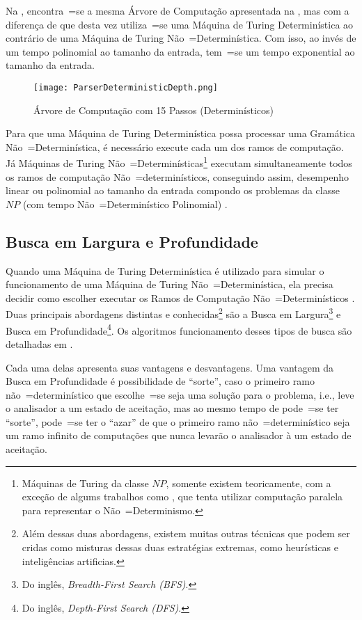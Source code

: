 Na ,
encontra~=se a mesma Árvore de Computação apresentada na ,
mas com a diferença de que desta vez utiliza~=se uma Máquina de Turing Determinística ao contrário de uma Máquina de Turing Não~=Determinística.
Com isso,
ao invés de um tempo polinomial ao tamanho da entrada,
tem~=se um tempo exponential ao tamanho da entrada.
\begin{figure}[!htb]
\caption{Árvore de Computação com 15 Passos (Determinísticos)}
\label{ParserDeterministic}
\centering
\texttt{[image: ParserDeterministicDepth.png]}
\end{figure}

Para que uma Máquina de Turing Determinística possa processar uma Gramática Não~=Determinística,
é necessário execute cada um dos ramos de computação.
Já Máquinas de Turing Não~=Determinísticas\footnote{
Máquinas de Turing da classe $NP$,
somente existem teoricamente,
com a exceção de algums trabalhos como ,
que tenta utilizar computação paralela para representar o Não~=Determinismo.
}
executam simultaneamente todos os ramos de computação Não~=determinísticos,
conseguindo assim, desempenho linear ou
polinomial ao tamanho da entrada compondo os problemas da classe $NP$ (com tempo Não~=Determinístico Polinomial) \cite{hopcroftBook}.


\subsection{Busca em Largura e Profundidade}
\label{buscaEmLarguraEProfundidade}

Quando uma Máquina de Turing Determinística é utilizado para simular o funcionamento de uma Máquina de Turing Não~=Determinística,
ela precisa decidir como escolher executar os Ramos de Computação Não~=Determinísticos \cite{sipserBook}.
Duas principais abordagens distintas e
conhecidas\footnote{
Além dessas duas abordagens,
existem muitas outras técnicas que podem ser cridas como misturas dessas duas estratégias extremas,
como heurísticas e inteligências artificias.
}
são a Busca em Largura\footnote{
Do inglês, \textit{Breadth-First Search (BFS)}.
}
e Busca em Profundidade\footnote{
Do inglês, \textit{Depth-First Search (DFS)}.
}.
Os algoritmos funcionamento desses tipos de busca são detalhadas em .

Cada uma delas apresenta suas vantagens e
desvantagens.
Uma vantagem da Busca em Profundidade é possibilidade de ``sorte'',
caso o primeiro ramo não~=determinístico que escolhe~=se seja uma solução para o problema,
i.e.,
leve o analisador a um estado de aceitação,
mas ao mesmo tempo de pode~=se ter ``sorte'',
pode~=se ter o ``azar'' de que o primeiro ramo não~=determinístico seja um ramo infinito de computações que nunca levarão o analisador à um estado de aceitação.

